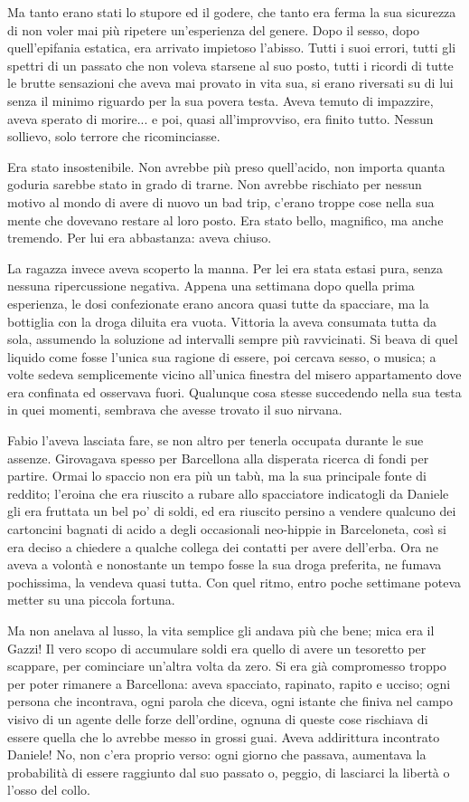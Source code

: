 Ma tanto erano stati lo stupore ed il godere, che tanto era ferma la sua sicurezza di non voler mai più ripetere un'esperienza del genere. Dopo il sesso, dopo quell'epifania estatica, era arrivato impietoso l'abisso. Tutti i suoi errori, tutti gli spettri di un passato che non voleva starsene al suo posto, tutti i ricordi di tutte le brutte sensazioni che aveva mai provato in vita sua, si erano riversati su di lui senza il minimo riguardo per la sua povera testa. Aveva temuto di impazzire, aveva sperato di morire... e poi, quasi all'improvviso, era finito tutto. Nessun sollievo, solo terrore che ricominciasse.

Era stato insostenibile. Non avrebbe più preso quell'acido, non importa quanta goduria sarebbe stato in grado di trarne. Non avrebbe rischiato per nessun motivo al mondo di avere di nuovo un bad trip, c'erano troppe cose nella sua mente che dovevano restare al loro posto. Era stato bello, magnifico, ma anche tremendo. Per lui era abbastanza: aveva chiuso.

La ragazza invece aveva scoperto la manna. Per lei era stata estasi pura, senza nessuna ripercussione negativa. Appena una settimana dopo quella prima esperienza, le dosi confezionate erano ancora quasi tutte da spacciare, ma la bottiglia con la droga diluita era vuota. Vittoria la aveva consumata tutta da sola, assumendo la soluzione ad intervalli sempre più ravvicinati. Si beava di quel liquido come fosse l'unica sua ragione di essere, poi cercava sesso, o musica; a volte sedeva semplicemente vicino all'unica finestra del misero appartamento dove era confinata ed osservava fuori. Qualunque cosa stesse succedendo nella sua testa in quei momenti, sembrava che avesse trovato il suo nirvana.

Fabio l'aveva lasciata fare, se non altro per tenerla occupata durante le sue assenze. Girovagava spesso per Barcellona alla disperata ricerca di fondi per partire. Ormai lo spaccio non era più un tabù, ma la sua principale fonte di reddito; l'eroina che era riuscito a rubare allo spacciatore indicatogli da Daniele gli era fruttata un bel po' di soldi, ed era riuscito persino a vendere qualcuno dei cartoncini bagnati di acido a degli occasionali neo-hippie in Barceloneta, così si era deciso a chiedere a qualche collega dei contatti per avere dell'erba. Ora ne aveva a volontà e nonostante un tempo fosse la sua droga preferita, ne fumava pochissima, la vendeva quasi tutta. Con quel ritmo, entro poche settimane poteva metter su una piccola fortuna.

Ma non anelava al lusso, la vita semplice gli andava più che bene; mica era il Gazzi! Il vero scopo di accumulare soldi era quello di avere un tesoretto per scappare, per cominciare un'altra volta da zero. Si era già compromesso troppo per poter rimanere a Barcellona: aveva spacciato, rapinato, rapito e ucciso; ogni persona che incontrava, ogni parola che diceva, ogni istante che finiva nel campo visivo di un agente delle forze dell'ordine, ognuna di queste cose rischiava di essere quella che lo avrebbe messo in grossi guai. Aveva addirittura incontrato Daniele! No, non c'era proprio verso: ogni giorno che passava, aumentava la probabilità di essere raggiunto dal suo passato o, peggio, di lasciarci la libertà o l'osso del collo.

